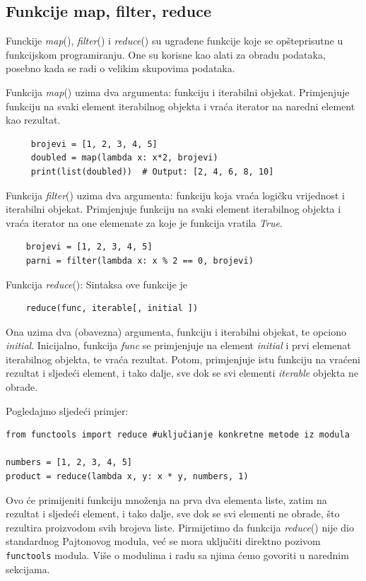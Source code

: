 \subsection{Funkcije map, filter, reduce}

Funckije \textit{map}(), \textit{filter}() i \textit{reduce}() su ugrađene funkcije koje se opšteprisutne u funkcijskom programiranju. One su korisne kao alati za obradu podataka, posebno kada se radi o velikim skupovima podataka.

Funkcija \textit{map}() uzima dva argumenta: funkciju i iterabilni objekat. Primjenjuje funkciju  na svaki element iterabilnog objekta i vraća iterator na naredni element kao rezultat. 

\begin{verbatim}
     brojevi = [1, 2, 3, 4, 5]
     doubled = map(lambda x: x*2, brojevi)
     print(list(doubled))  # Output: [2, 4, 6, 8, 10]
\end{verbatim}


Funkcija \textit{filter}() uzima dva argumenta: funkciju koja vraća logičku vrijednost i iterabilni objekat. Primjenjuje funkciju na svaki element iterabilnog objekta i vraća iterator na one elemenate za koje je funkcija vratila \emph{True}. 
\begin{verbatim}
	brojevi = [1, 2, 3, 4, 5]
	parni = filter(lambda x: x % 2 == 0, brojevi)
\end{verbatim}

Funkcija  \textit{reduce}(): Sintaksa ove funkcije je

\begin{verbatim}
	reduce(func, iterable[, initial ])
\end{verbatim}

Ona uzima dva (obavezna) argumenta,  funkciju i iterabilni objekat, te opciono \textit{initial}. Inicijalno, funkcija \textit{func} se primjenjuje na element \emph{initial} i prvi elemenat iterabilnog objekta, te vraća rezultat. Potom,    primjenjuje istu funkciju na vraćeni rezultat i sljedeći element, i tako dalje, sve dok se svi elementi \emph{iterable} objekta ne obrade. 

Pogledajmo sljedeći primjer: 
\begin{verbatim}
from functools import reduce #uključianje konkretne metode iz modula 

numbers = [1, 2, 3, 4, 5]
product = reduce(lambda x, y: x * y, numbers, 1)
\end{verbatim}

Ovo će primijeniti funkciju množenja na prva dva elementa liste, zatim na rezultat i sljedeći element, i tako dalje, sve dok se svi elementi ne obrade, što rezultira proizvodom svih brojeva liste. Pirmijetimo da funkcija \textit{reduce}() nije dio standardnog Pajtonovog modula, već se mora uključiti direktno pozivom \texttt{functools} modula. Više o modulima i radu sa njima ćemo govoriti u narednim sekcijama.



